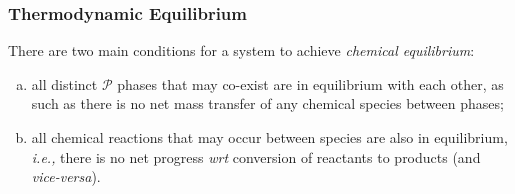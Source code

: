 \documentclass[12pts,a4paper,amsmath,amssymb,floatfix]{article}%
\newcommand{\ie}{{\it i.e., }}
\newcommand{\wrt}{{\it wrt }}
\newcounter{reaction}
\begin{document}
\subsubsection{Thermodynamic Equilibrium}\label{Section:04:thermodynamicEquilibrium}

There are two main conditions for a system to achieve {\it chemical equilibrium}:
  \begin{enumerate}[a)]
     \item all distinct $\mathcal{P}$ phases that may co-exist are in equilibrium with each other, as such as there is no net mass transfer of any chemical species between phases;
     \item all chemical reactions that may occur between species are also in equilibrium, \ie there is no net progress \wrt conversion of reactants to products (and {\it vice-versa}).
  \end{enumerate}
\end{document}
